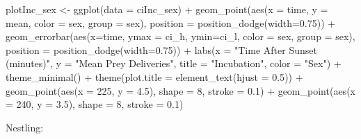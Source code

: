 \documentclass[
]{article}
\newenvironment{Shaded}{\begin{snugshade}}{\end{snugshade}}
\newcommand{\AttributeTok}[1]{\textcolor[rgb]{0.77,0.63,0.00}{#1}}
\newcommand{\DecValTok}[1]{\textcolor[rgb]{0.00,0.00,0.81}{#1}}
\newcommand{\FloatTok}[1]{\textcolor[rgb]{0.00,0.00,0.81}{#1}}
\newcommand{\FunctionTok}[1]{\textcolor[rgb]{0.00,0.00,0.00}{#1}}
\newcommand{\NormalTok}[1]{#1}
\newcommand{\OtherTok}[1]{\textcolor[rgb]{0.56,0.35,0.01}{#1}}
\newcommand{\SpecialCharTok}[1]{\textcolor[rgb]{0.00,0.00,0.00}{#1}}
\newcommand{\StringTok}[1]{\textcolor[rgb]{0.31,0.60,0.02}{#1}}
\begin{document}
\begin{Shaded}
\begin{Highlighting}[]
\NormalTok{plotInc\_sex }\OtherTok{\textless{}{-}} \FunctionTok{ggplot}\NormalTok{(}\AttributeTok{data =}\NormalTok{ ciInc\_sex) }\SpecialCharTok{+}
  \FunctionTok{geom\_point}\NormalTok{(}\FunctionTok{aes}\NormalTok{(}\AttributeTok{x =}\NormalTok{ time, }\AttributeTok{y =}\NormalTok{ mean, }\AttributeTok{color =}\NormalTok{ sex, }\AttributeTok{group =}\NormalTok{ sex),}
             \AttributeTok{position =} \FunctionTok{position\_dodge}\NormalTok{(}\AttributeTok{width=}\FloatTok{0.75}\NormalTok{)) }\SpecialCharTok{+}
  \FunctionTok{geom\_errorbar}\NormalTok{(}\FunctionTok{aes}\NormalTok{(}\AttributeTok{x=}\NormalTok{time, }\AttributeTok{ymax =}\NormalTok{ ci\_h, }\AttributeTok{ymin=}\NormalTok{ci\_l, }\AttributeTok{color =}\NormalTok{ sex, }
                    \AttributeTok{group =}\NormalTok{ sex),}
                \AttributeTok{position =} \FunctionTok{position\_dodge}\NormalTok{(}\AttributeTok{width=}\FloatTok{0.75}\NormalTok{)) }\SpecialCharTok{+}
  \FunctionTok{labs}\NormalTok{(}\AttributeTok{x =} \StringTok{"Time After Sunset (minutes)"}\NormalTok{, }\AttributeTok{y =} \StringTok{"Mean Prey Deliveries"}\NormalTok{, }
       \AttributeTok{title =} \StringTok{"Incubation"}\NormalTok{, }\AttributeTok{color =} \StringTok{"Sex"}\NormalTok{) }\SpecialCharTok{+}
  \FunctionTok{theme\_minimal}\NormalTok{() }\SpecialCharTok{+}
  \FunctionTok{theme}\NormalTok{(}\AttributeTok{plot.title =} \FunctionTok{element\_text}\NormalTok{(}\AttributeTok{hjust =} \FloatTok{0.5}\NormalTok{)) }\SpecialCharTok{+}
  \FunctionTok{geom\_point}\NormalTok{(}\FunctionTok{aes}\NormalTok{(}\AttributeTok{x =} \DecValTok{225}\NormalTok{, }\AttributeTok{y =} \FloatTok{4.5}\NormalTok{), }\AttributeTok{shape =} \DecValTok{8}\NormalTok{, }\AttributeTok{stroke =} \FloatTok{0.1}\NormalTok{) }\SpecialCharTok{+}
  \FunctionTok{geom\_point}\NormalTok{(}\FunctionTok{aes}\NormalTok{(}\AttributeTok{x =} \DecValTok{240}\NormalTok{, }\AttributeTok{y =} \FloatTok{3.5}\NormalTok{), }\AttributeTok{shape =} \DecValTok{8}\NormalTok{, }\AttributeTok{stroke =} \FloatTok{0.1}\NormalTok{)}
\end{Highlighting}
\end{Shaded}

Nestling:
\end{document}
